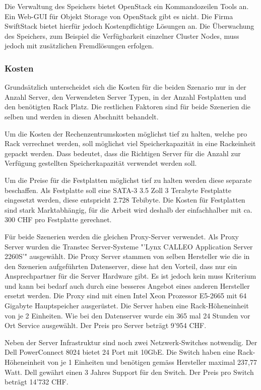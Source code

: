 Die Verwaltung des Speichers bietet OpenStack ein Kommandozeilen Tools an. Ein Web-GUI für Objekt Storage von OpenStack gibt es nicht. Die Firma SwiftStack bietet hierfür jedoch Kostenpflichtige Lösungen an. Die Überwachung des Speichers, zum Beispiel die Verfügbarkeit einzelner Cluster Nodes, muss jedoch mit zusätzlichen Fremdlösungen erfolgen. 

\subsubsection*{Kosten}
Grundsätzlich unterscheidet sich die Kosten für die beiden Szenario nur in der Anzahl Server, den Verwendeten Server Typen, in der Anzahl Festplatten und den benötigten Rack Platz. Die restlichen Faktoren sind für beide Szenerien die selben und werden in diesen Abschnitt behandelt.

Um die Kosten der Rechenzentrumskosten möglichst tief zu halten, welche pro Rack verrechnet werden, soll möglichst viel Speicherkapazität in eine Rackeinheit gepackt werden. Dass bedeutet, dass die Richtigen Server für die Anzahl zur Verfügung gestellten Speicherkapazität verwendet werden soll.

Um die Preise für die Festplatten möglichst tief zu halten werden diese separate beschaffen. Als Festplatte soll eine SATA-3 3.5 Zoll 3 Terabyte Festplatte eingesetzt werden, diese entspricht 2.728 Tebibyte. Die Kosten für Festplatten sind stark Marktabhängig, für die Arbeit wird deshalb der einfachhalber mit ca. 300 CHF pro Festplatte gerechnet.

Für beide Szenerien werden die gleichen Proxy-Server verwendet. Als Proxy Server wurden die Transtec Server-Systeme "'Lynx CALLEO Application Server 2260S'" ausgewählt. Die Proxy Server stammen von selben Hersteller wie die in den Szenerien aufgeführten Datenserver, diese hat den Vorteil, dass nur ein Ansprechpartner für die Server Hardware gibt. Es ist jedoch kein muss Kriterium und kann bei bedarf auch durch eine besseres Angebot eines anderen Hersteller ersetzt werden. Die Proxy sind mit einen Intel Xeon Prozessor E5-2665 mit 64 Gigabyte Hauptspeicher ausgerüstet. Die Server haben eine Rack-Höheneinheit von je 2 Einheiten. Wie bei den Datenserver wurde ein 365 mal 24 Stunden vor Ort Service ausgewählt. Der Preis pro Server beträgt 9'954 CHF.

Neben der Server Infrastruktur sind noch zwei Netzwerk-Switches notwendig. Der Dell PowerConnect 8024 bietet 24 Port mit 10GbE. Die Switch haben eine Rack-Höheneinheit von je 1 Einheiten und benötigen gemäss Hersteller maximal 237,77 Watt. Dell gewährt einen 3 Jahres Support für den Switch. Der Preis pro Switch beträgt 14'732 CHF.

